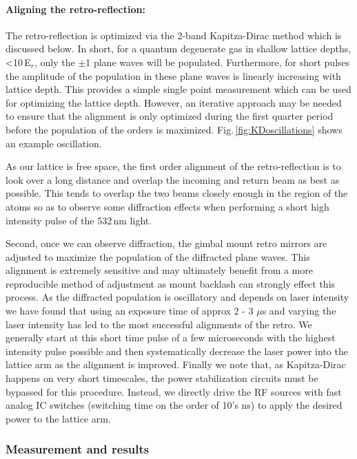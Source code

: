 \paragraph{Aligning the retro-reflection:}
The retro-reflection is optimized via the 2-band Kapitza-Dirac method which is discussed below.
In short, for a quantum degenerate gas in shallow lattice depths, <10\,E$_r$, only the $\pm$1 plane waves will be populated.
Furthermore, for short pulses the amplitude of the population in these plane waves is linearly increasing with lattice depth.
This provides a simple single point measurement which can be used for optimizing the lattice depth.
However, an iterative approach may be needed to ensure that the alignment is only optimized during the first quarter period before the population of the orders is maximized.
Fig.\,\ref{fig:KDoscillations} shows an example oscillation.

As our lattice is free space, the first order alignment of the retro-reflection is to look over a long distance and overlap the incoming and return beam as best as possible.
This tends to overlap the two beams closely enough in the region of the atoms so as to observe some diffraction effects when performing a short high intensity pulse of the 532\,nm light.

Second, once we can observe diffraction, the gimbal mount retro mirrors are adjusted to maximize the population of the diffracted plane waves.
This alignment is extremely sensitive and may ultimately benefit from a more reproducible method of adjustment as mount backlash can strongly effect this process.
As the diffracted population is oscillatory and depends on laser intensity we have found that using an exposure time of approx 2 - 3 $\mu$s and varying the laser intensity has led to the most successful alignments of the retro.
We generally start at this short time pulse of a few microseconds with the highest intensity pulse possible and then systematically decrease the laser power into the lattice arm as the alignment is improved.
Finally we note that, as Kapitza-Dirac happens on very short timescales, the power stabilization circuits must be bypassed for this procedure.
Instead, we directly drive the RF sources with fast analog IC switches (switching time on the order of 10's ns) to apply the desired power to the lattice arm.

\subsubsection{Measurement and results}
